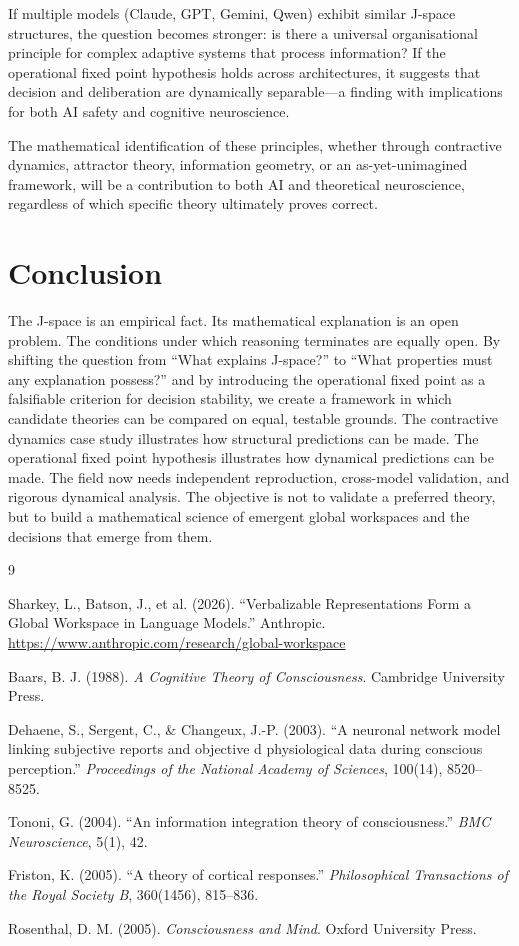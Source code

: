 \documentclass[11pt,a4paper]{article}
\theoremstyle{definition}
\begin{document}
If multiple models (Claude, GPT, Gemini, Qwen) exhibit similar J-space
structures, the question becomes stronger: is there a universal organisational
principle for complex adaptive systems that process information? If the operational
fixed point hypothesis holds across architectures, it suggests that decision
and deliberation are dynamically separable---a finding with implications for
both AI safety and cognitive neuroscience.

The mathematical identification of these principles, whether through contractive
dynamics, attractor theory, information geometry, or an as-yet-unimagined
framework, will be a contribution to both AI and theoretical neuroscience,
regardless of which specific theory ultimately proves correct.

\section{Conclusion}
\label{sec:conclusion}

The J-space is an empirical fact. Its mathematical explanation is an open
problem. The conditions under which reasoning terminates are equally open.
By shifting the question from ``What explains J-space?'' to ``What properties
must any explanation possess?'' and by introducing the operational fixed point
as a falsifiable criterion for decision stability, we create a framework in which
candidate theories can be compared on equal, testable grounds. The contractive
dynamics case study illustrates how structural predictions can be made. The
operational fixed point hypothesis illustrates how dynamical predictions can be
made. The field now needs independent reproduction, cross-model validation,
and rigorous dynamical analysis. The objective is not to validate a preferred
theory, but to build a mathematical science of emergent global workspaces and
the decisions that emerge from them.

\begin{thebibliography}{9}

Sharkey, L., Batson, J., et al. (2026).
``Verbalizable Representations Form a Global Workspace in Language Models.''
Anthropic. \url{https://www.anthropic.com/research/global-workspace}

Baars, B. J. (1988).
\textit{A Cognitive Theory of Consciousness}.
Cambridge University Press.

Dehaene, S., Sergent, C., \& Changeux, J.-P. (2003).
``A neuronal network model linking subjective reports and objective
d physiological data during conscious perception.''
\textit{Proceedings of the National Academy of Sciences}, 100(14), 8520--8525.

Tononi, G. (2004).
``An information integration theory of consciousness.''
\textit{BMC Neuroscience}, 5(1), 42.

Friston, K. (2005).
``A theory of cortical responses.''
\textit{Philosophical Transactions of the Royal Society B}, 360(1456), 815--836.

Rosenthal, D. M. (2005).
\textit{Consciousness and Mind}.
Oxford University Press.

\end{thebibliography}
\end{document}

